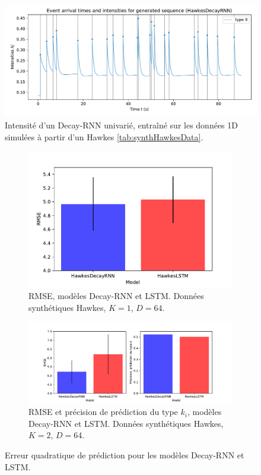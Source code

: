 \documentclass[../main.tex]{subfiles}
\begin{document}
\begin{figure}[!ht]
	\includegraphics[width=\linewidth]{../results/intensity_HawkesDecayRNN_1d_hidden64_20181206-234848.pdf}
	\caption{Intensité d'un Decay-RNN univarié, entraîné sur les données 1D simulées à partir d'un Hawkes \autoref{tab:synthHawkesData}.}\label{fig:1DRNNintensityPlot}
\end{figure}

\begin{figure}[!ht]
	\centering
	\begin{subfigure}{0.8\linewidth}
		\centering
		\includegraphics[width=\linewidth]{../results/1D_Hawkes_Data_RMSE.pdf}
		\caption{RMSE, modèles Decay-RNN et LSTM. Données synthétiques Hawkes, $K=1$, $D=64$.}\label{fig:rmse1DhawkesData}	
	\end{subfigure}
	\begin{subfigure}{0.8\linewidth}
		\centering
		\includegraphics[width=\linewidth]{../results/2D_Hawkes_Data_RMSE.pdf}
		\caption{RMSE et précision de prédiction du type $k_i$, modèles Decay-RNN et LSTM. Données synthétiques Hawkes, $K=2$, $D=64$.}\label{fig:rmse2DhawkesData}	
	\end{subfigure}
	\caption{Erreur quadratique de prédiction pour les modèles Decay-RNN et LSTM.}\label{fig:rmseSynthData}
\end{figure}
\end{document}
